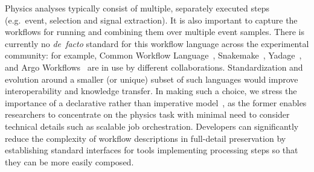\documentclass[11pt]{article}
\begin{document}
Physics analyses typically consist of multiple, separately executed steps (e.g.~event, selection and signal extraction). It is also important to capture the workflows for running and combining them over multiple event samples. There is currently no \emph{de~facto} standard for this workflow language across the experimental community: for example, Common Workflow Language~\cite{CWL}, Snakemake~\cite{SnakeMake}, Yadage~\cite{Cranmer:2017frf,yadage_code}, and Argo Workflows~\cite{argo} are in use by different collaborations. Standardization and evolution around a smaller (or unique) subset of such languages would improve interoperability and knowledge transfer. In making such a choice, we stress the importance of a declarative rather than imperative model~\cite{10.3389/fdata.2021.661501}, as the former enables researchers to concentrate on the physics task with minimal need to consider technical details such as scalable job orchestration. Developers can significantly reduce the complexity of workflow descriptions in full-detail preservation by establishing standard interfaces for tools implementing processing steps so that they can be more easily composed.




\end{document}
